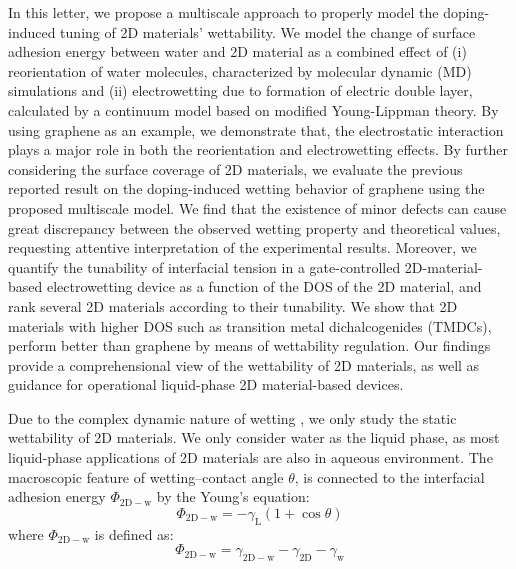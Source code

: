 \documentclass[aps,prl,reprint,groupedaddress,amsmath,amssymb, showpacs]{revtex4-1}
\begin{document}
In this letter, we propose a multiscale approach to properly model the
doping-induced tuning of 2D materials' wettability. We model the
change of surface adhesion energy between water and 2D material as a
combined effect of (i) reorientation of water molecules, characterized
by molecular dynamic (MD) simulations and (ii) electrowetting due to
formation of electric double layer, calculated by a continuum model
based on modified Young-Lippman theory. By using graphene as an
example, we demonstrate that, the electrostatic interaction plays a
major role in both the reorientation and electrowetting effects. By
further considering the surface coverage of 2D materials, we evaluate
the previous reported result on the doping-induced wetting behavior of
graphene using the proposed multiscale model. We find that the
existence of minor defects can cause great discrepancy between the
observed wetting property and theoretical values, requesting attentive
interpretation of the experimental results. Moreover, we quantify the
tunability of interfacial tension in a gate-controlled
2D-material-based electrowetting device as a function of the DOS of
the 2D material, and rank several 2D materials according to their
tunability. We show that 2D materials with higher DOS such as
transition metal dichalcogenides (TMDCs), perform better than graphene
by means of wettability regulation. Our findings provide a
comprehensional view of the wettability of 2D materials, as well as
guidance for operational liquid-phase 2D material-based devices.



Due to the complex dynamic nature of wetting
\cite{Cassie_1944,Wenzel_1936,Gao_2007,Marmur_2009}, we only study the
static wettability of 2D materials. We only consider water as the
liquid phase, as most liquid-phase applications of 2D materials are
also in aqueous environment. The macroscopic feature of
wetting--contact angle \(\theta\), is connected to the interfacial
adhesion energy \(\Phi_{\mathrm{2D-w}}\) by the Young's equation:
\begin{equation}
\label{eqn:young's equation}
\Phi_{\mathrm{2D-w}} = -\gamma_{\mathrm{L}}(1+\cos\theta)
\end{equation}
where \(\Phi_{\mathrm{2D-w}}\) is defined as:
\begin{equation}
\label{eqn:def-adhesion}
\Phi_{\mathrm{2D-w}} = \gamma_{\mathrm{2D-w}} - \gamma_{\mathrm{2D}} - \gamma_{\mathrm{w}}
\end{equation}
\end{document}
